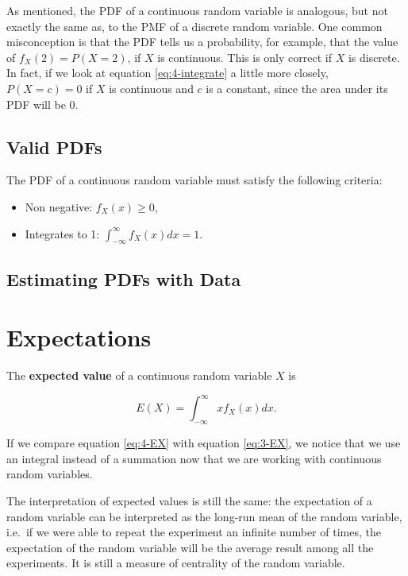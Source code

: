 \documentclass[
]{book}
\providecommand{\tightlist}{%
  \setlength{\itemsep}{0pt}\setlength{\parskip}{0pt}}
\begin{document}
As mentioned, the PDF of a continuous random variable is analogous, but not exactly the same as, to the PMF of a discrete random variable. One common misconception is that the PDF tells us a probability, for example, that the value of \(f_X(2) = P(X=2)\), if \(X\) is continuous. This is only correct if \(X\) is discrete. In fact, if we look at equation \eqref{eq:4-integrate} a little more closely, \(P(X=c) = 0\) if \(X\) is continuous and \(c\) is a constant, since the area under its PDF will be 0.

\subsection{Valid PDFs}\label{valid-pdfs}

The PDF of a continuous random variable must satisfy the following criteria:

\begin{itemize}
\tightlist
\item
  Non negative: \(f_X(x) \geq 0\),
\item
  Integrates to 1: \(\int_{-\infty}^{\infty}f_X(x) dx = 1\).
\end{itemize}

\subsection{Estimating PDFs with Data}\label{estimating-pdfs-with-data}

\section{Expectations}\label{expectations-1}

The \textbf{expected value} of a continuous random variable \(X\) is

\begin{equation} 
E(X) = \int_{-\infty}^{\infty} x f_X(x) dx.
\label{eq:4-EX}
\end{equation}

If we compare equation \eqref{eq:4-EX} with equation \eqref{eq:3-EX}, we notice that we use an integral instead of a summation now that we are working with continuous random variables.

The interpretation of expected values is still the same: the expectation of a random variable can be interpreted as the long-run mean of the random variable, i.e.~if we were able to repeat the experiment an infinite number of times, the expectation of the random variable will be the average result among all the experiments. It is still a measure of centrality of the random variable.
\end{document}
